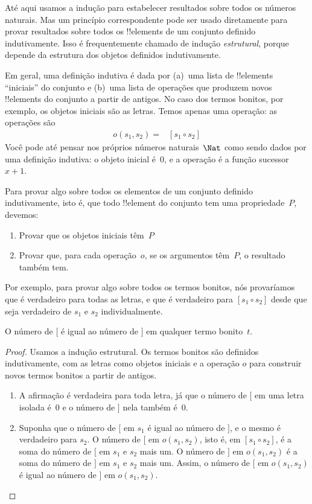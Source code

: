 \documentclass[../../../include/open-logic-section]{subfiles}
\begin{document}


Até aqui usamos a indução para estabelecer resultados sobre todos os números
naturais. Mas um princípio correspondente pode ser usado diretamente para provar
resultados sobre todos os !!{element}s de um conjunto definido indutivamente.  Isso é
frequentemente chamado de indução \emph{estrutural}, porque depende da
estrutura dos objetos definidos indutivamente.

Em geral, uma definição indutiva é dada por (a)~uma lista de
!!{element}s ``iniciais'' do conjunto e (b)~uma lista de operações que
produzem novos !!{element}s do conjunto a partir de antigos. No caso dos termos
bonitos, por exemplo, os objetos iniciais são as letras. Temos apenas
uma operação: as operações são
\begin{align*}
  o(s_1, s_2) = & [s_1 \circ s_2]
\end{align*}
Você pode até pensar nos próprios números naturais~$\Nat$ como sendo
dados por uma definição indutiva: o objeto inicial é~$0$, e a
operação é a função sucessor~$x + 1$.

Para provar algo sobre todos os elementos de um conjunto definido
indutivamente, isto é, que todo !!{element} do conjunto tem uma
propriedade~$P$, devemos:
\begin{enumerate}
\item Provar que os objetos iniciais têm~$P$
\item Provar que, para cada operação~$o$, se os argumentos têm~$P$,
  o resultado também tem.
\end{enumerate}
Por exemplo, para provar algo sobre todos os termos bonitos, nós
provaríamos que é verdadeiro para todas as letras, e que é verdadeiro
para $[s_1 \circ s_2]$ desde que seja verdadeiro de $s_1$ e $s_2$
individualmente.

\begin{prop}
  O número de $[$ é igual ao número de $]$ em qualquer termo bonito~$t$.
\end{prop}

\begin{proof}
Usamos a indução estrutural.  Os termos bonitos são definidos indutivamente, com
as letras como objetos iniciais e a operação $o$ para construir novos
termos bonitos a partir de antigos.
\begin{enumerate}
\item A afirmação é verdadeira para toda letra, já que o número de $[$ em uma
  letra isolada é~$0$ e o número de $]$ nela também é~$0$.
\item Suponha que o número de $[$ em $s_1$ é igual ao número de $]$, e
  o mesmo é verdadeiro para $s_2$. O número de $[$ em $o(s_1, s_2)$, isto é, em
    $[s_1 \circ s_2]$, é a soma do número de $[$ em $s_1$ e
      $s_2$ mais um. O número de $]$ em $o(s_1, s_2)$ é a soma do número
    de $]$ em $s_1$ e $s_2$ mais um. Assim, o número de $[$ em $o(s_1, s_2)$
    é igual ao número de $]$ em $o(s_1,s_2)$.
\end{enumerate}
\end{proof}
\end{document}
